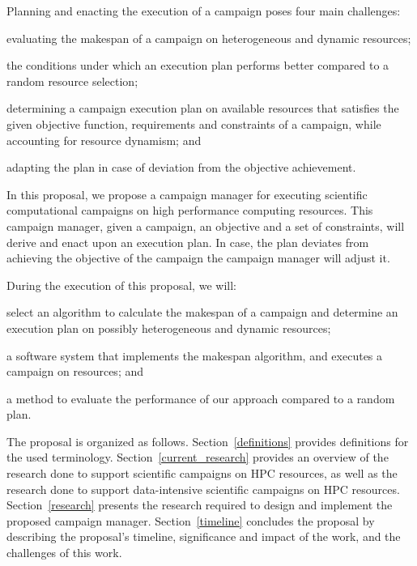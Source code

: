 Planning and enacting the execution of a campaign poses four main challenges: 
\begin{inparaenum}[(i)]
\item evaluating the makespan of a campaign on heterogeneous and dynamic resources;
\item the conditions under which an execution plan performs better compared to a random resource selection;
\item determining a campaign execution plan on available resources that satisfies the given objective function, requirements and constraints of a campaign, while accounting for resource dynamism; and
\item adapting the plan in case of deviation from the objective achievement.
\end{inparaenum}

In this proposal, we propose a campaign manager for executing scientific computational campaigns on high performance computing resources.
This campaign manager, given a campaign, an objective and a set of constraints, will derive and enact upon an execution plan. 
In case, the plan deviates from achieving the objective of the campaign the campaign manager will adjust it.

During the execution of this proposal, we will:
\begin{inparaenum}[(1)]
\item select an algorithm to calculate the makespan of a campaign and determine an execution plan on possibly heterogeneous and dynamic resources;
\item a software system that implements the makespan algorithm, and executes a campaign on resources; and 
\item a method to evaluate the performance of our approach compared to a random plan. 
\end{inparaenum}

The proposal is organized as follows.
Section~\ref{definitions} provides definitions for the used terminology.
Section~\ref{current_research} provides an overview of the research done to support scientific campaigns on HPC resources, as well as the research done to support data-intensive scientific campaigns on HPC resources.
Section~\ref{research} presents the research required to design and implement the proposed campaign manager.
Section~\ref{timeline} concludes the proposal by describing the proposal's timeline, significance and impact of the work, and the challenges of this work.